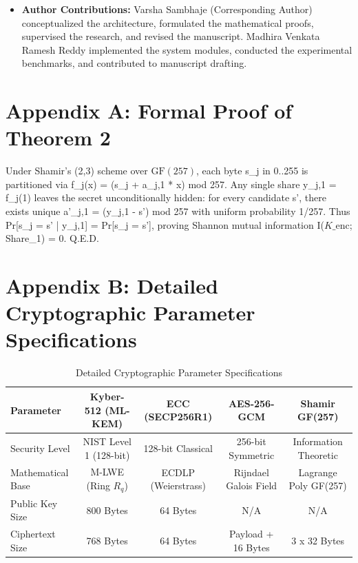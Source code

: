 \documentclass[5p,times]{elsarticle}
\begin{document}
\begin{itemize}
  \item \textbf{Author Contributions:} Varsha Sambhaje (Corresponding Author) conceptualized the architecture, formulated the mathematical proofs, supervised the research, and revised the manuscript. Madhira Venkata Ramesh Reddy implemented the system modules, conducted the experimental benchmarks, and contributed to manuscript drafting.
\end{itemize}


\section*{Appendix A: Formal Proof of Theorem 2}

Under Shamir's (2,3) scheme over $\text{GF}(257)$, each byte s\_j in {0..255} is partitioned via f\_j(x) = (s\_j + a\_{j,1} * x) mod 257. Any single share y\_{j,1} = f\_j(1) leaves the secret unconditionally hidden: for every candidate s', there exists unique a'\_{j,1} = (y\_{j,1} - s') mod 257 with uniform probability 1/257. Thus Pr[s\_j = s' | y\_{j,1}] = Pr[s\_j = s'], proving Shannon mutual information I($K\_{\text{enc}}$; Share\_1) = 0. Q.E.D.


\section*{Appendix B: Detailed Cryptographic Parameter Specifications}

\begin{table}[!ht]
  \centering
  \tiny
  \caption{Detailed Cryptographic Parameter Specifications}
  \label{tab:13}
  \begin{tabularx}{\linewidth}{p{1.6cm}cccc}
    \toprule
    \textbf{Parameter} & \textbf{Kyber-512 (ML-KEM)} & \textbf{ECC (SECP256R1)} & \textbf{AES-256-GCM} & \textbf{Shamir GF(257)} \\
    \midrule
    Security Level & NIST Level 1 (128-bit) & 128-bit Classical & 256-bit Symmetric & Information Theoretic \\
    Mathematical Base & M-LWE (Ring $R_q$) & ECDLP (Weierstrass) & Rijndael Galois Field & Lagrange Poly GF(257) \\
    Public Key Size & 800 Bytes & 64 Bytes & N/A & N/A \\
    Ciphertext Size & 768 Bytes & 64 Bytes & Payload + 16 Bytes & 3 x 32 Bytes \\
    \bottomrule
  \end{tabularx}
\end{table}
\end{document}
